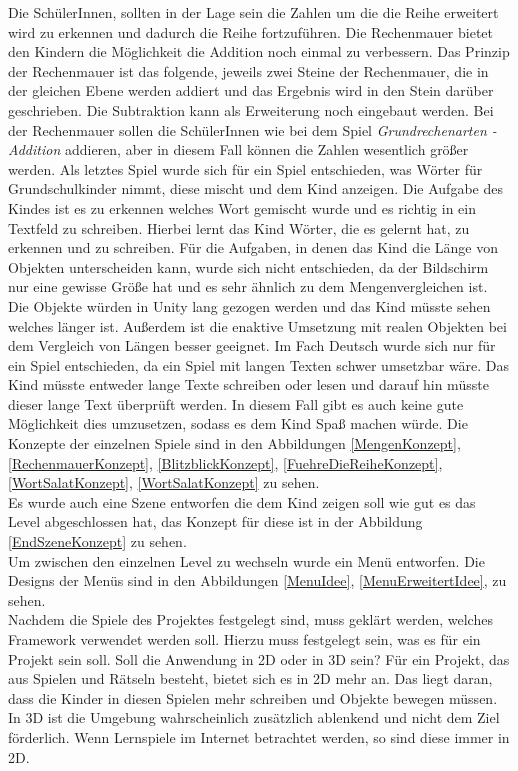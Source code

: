 Die SchülerInnen, sollten in der Lage sein die Zahlen um die die Reihe erweitert wird zu erkennen und dadurch die Reihe fortzuführen. Die Rechenmauer bietet den Kindern die Möglichkeit die Addition noch einmal zu verbessern. Das Prinzip der Rechenmauer ist das folgende, jeweils zwei Steine der Rechenmauer, die in der gleichen Ebene werden addiert und das Ergebnis wird in den Stein darüber geschrieben. Die Subtraktion kann als Erweiterung noch eingebaut werden. Bei der Rechenmauer sollen die SchülerInnen wie bei dem Spiel \textit{Grundrechenarten - Addition} addieren, aber in diesem Fall können die Zahlen wesentlich größer werden. Als letztes Spiel wurde sich für ein Spiel entschieden, was Wörter für Grundschulkinder nimmt, diese mischt und dem Kind anzeigen. Die Aufgabe des Kindes ist es zu erkennen welches Wort gemischt wurde und es richtig in ein Textfeld zu schreiben. Hierbei lernt das Kind Wörter, die es gelernt hat, zu erkennen und zu schreiben. Für die Aufgaben, in denen das Kind die Länge von Objekten unterscheiden kann, wurde sich nicht entschieden, da der Bildschirm nur eine gewisse Größe hat und es sehr ähnlich zu dem Mengenvergleichen ist. Die Objekte würden in Unity lang gezogen werden und das Kind müsste sehen welches länger ist. Außerdem ist die enaktive Umsetzung mit realen Objekten bei dem Vergleich von Längen besser geeignet. Im Fach Deutsch wurde sich nur für ein Spiel entschieden, da ein Spiel mit langen Texten schwer umsetzbar wäre. Das Kind müsste entweder lange Texte schreiben oder lesen und darauf hin müsste dieser lange Text überprüft werden. In diesem Fall gibt es auch keine gute Möglichkeit dies umzusetzen, sodass es dem Kind Spaß machen würde. Die Konzepte der einzelnen Spiele sind in den Abbildungen \ref{MengenKonzept}, \ref{RechenmauerKonzept}, \ref{BlitzblickKonzept}, \ref{FuehreDieReiheKonzept}, \ref{WortSalatKonzept}, \ref{WortSalatKonzept} zu sehen.\\
Es wurde auch eine Szene entworfen die dem Kind zeigen soll wie gut es das Level abgeschlossen hat, das Konzept für diese ist in der Abbildung \ref{EndSzeneKonzept} zu sehen.\\       
Um zwischen den einzelnen Level zu wechseln wurde ein Menü entworfen.
Die Designs der Menüs sind in den Abbildungen \ref{MenuIdee}, \ref{MenuErweitertIdee}, zu sehen.\\
Nachdem die Spiele des Projektes festgelegt sind, muss geklärt werden, welches Framework verwendet werden soll. Hierzu muss festgelegt sein, was es für ein Projekt sein soll. Soll die Anwendung in 2D oder in 3D sein? Für ein Projekt, das aus Spielen und Rätseln besteht, bietet sich es in 2D mehr an. Das liegt daran, dass die Kinder in diesen Spielen mehr schreiben und Objekte bewegen müssen. In 3D ist die Umgebung wahrscheinlich zusätzlich ablenkend und nicht dem Ziel förderlich. Wenn Lernspiele im Internet betrachtet werden, so sind diese immer in 2D.\\
